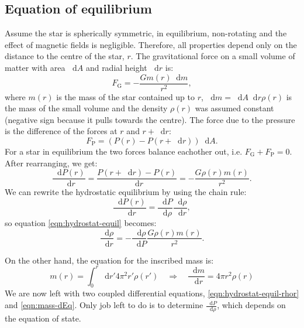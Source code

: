 \documentclass[]{article}
\newcommand{\dd}{\mathop{}\!\mathrm{d}}
\begin{document}
\subsection{Equation of equilibrium}\label{subsec:test}
	Assume the star is spherically symmetric, in equilibrium, non-rotating and the effect of magnetic fields is negligible. Therefore, all properties depend only on the distance to the centre of the star, $r$. The gravitational force on a small volume of matter with area $\dd A$ and radial height $\dd r$ is:
	\begin{equation}
		F_\mathrm{G} = - \frac{G m\left(r\right) \dd m}{r^2},
	\end{equation}
	where $m\left(r\right)$ is the mass of the star contained up to $r$, $\dd m = \dd A \dd r \rho \left(r\right)$ is the mass of the small volume and the density $\rho \left(r\right)$ was assumed constant (negative sign because it pulls towards the centre). The force due to the pressure is the difference of the forces at $r$ and $r + \dd r$:
	\begin{equation}
	F_\mathrm{P} = \left( P\left(r\right) - P\left(r + \dd r\right)\right) \dd A.
	\end{equation}
	For a star in equilibrium the two forces balance eachother out, i.e. $F_\mathrm{G} + F_\mathrm{P} = 0$. After rearranging, we get:
	\begin{equation} \label{eqn:hydrostat-equil}
		\frac{\dd P(r)}{\dd r} = \frac{P\left(r + \dd r\right) - P\left(r\right)}{\dd r} = - \frac{G \rho(r) m(r)}{r^2}.
	\end{equation}
	We can rewrite the hydrostatic equilibrium by using the chain rule:
	\begin{equation}
		\frac{\dd P(r)}{\dd r} = \frac{\dd P}{\dd \rho} \frac{\dd \rho}{\dd r},
	\end{equation}
	so equation \eqref{eqn:hydrostat-equil} becomes:
	\begin{equation}\label{eqn:hydrostat-equil-rhor}
		\frac{\dd \rho}{\dd r} = - \frac{\dd \rho}{\dd P} \frac{G \rho(r) m(r)}{r^2}.
	\end{equation}

	On the other hand, the equation for the inscribed mass is:
	\begin{equation}\label{eqn:mass-dEq}
		m(r) = \int_0^r \dd r' 4 \pi^2 r' \rho\left(r'\right) \quad \Rightarrow \quad \frac{\dd m}{\dd r} = 4 \pi r^2 \rho(r)
	\end{equation}
	We are now left with two coupled differential equations, \eqref{eqn:hydrostat-equil-rhor} and \eqref{eqn:mass-dEq}. Only job left to do is to determine $\frac{\dd P}{\dd \rho}$, which depends on the equation of state.
\end{document}
